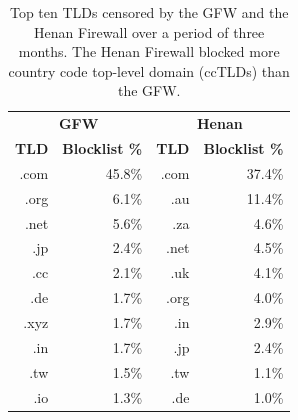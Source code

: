 \documentclass[conference,compsoc]{IEEEtran}
\begin{document}
\begin{table}[t]
  \caption{Top ten TLDs censored by the GFW and the Henan Firewall over a period of three months.
  The Henan Firewall blocked more country code top-level domain (ccTLDs) than the GFW.}
  \small
  \centering
  \begin{tabular}{rr|rr}
    \toprule
    \multicolumn{2}{c|}{\textbf{GFW}} & \multicolumn{2}{c}{\textbf{Henan}} \\ %
    \textbf{TLD} & \textbf{Blocklist \%} & \textbf{TLD} & \textbf{Blocklist \%} \\
    \midrule

  .com & 45.8\% & .com & 37.4\% \\ %
  .org & 6.1\% & .au & 11.4\% \\   %
  .net & 5.6\% & .za & 4.6\% \\    %
  .jp & 2.4\% & .net & 4.5\% \\    %
  .cc & 2.1\% & .uk & 4.1\% \\     %
  .de & 1.7\% & .org & 4.0\% \\    %
  .xyz & 1.7\% & .in & 2.9\% \\    %
  .in & 1.7\% & .jp & 2.4\% \\     %
  .tw & 1.5\% & .tw & 1.1\% \\     %
  .io & 1.3\% & .de & 1.0\% \\     %


    \bottomrule

  \end{tabular}
  \label{table:tlds}
  \end{table}
\end{document}
